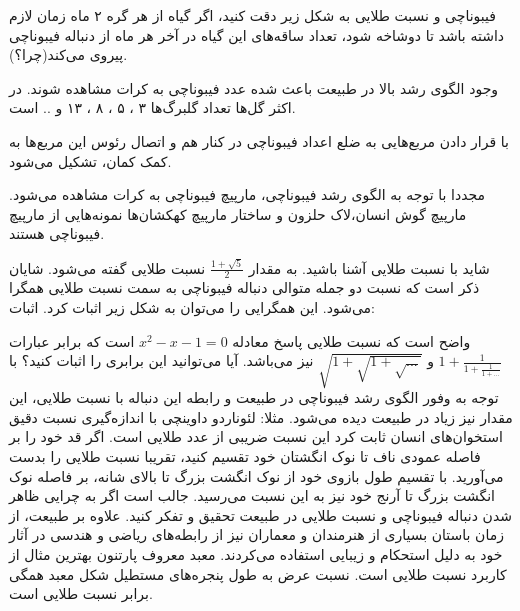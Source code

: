 \begin{EXTRA}{فیبوناچی و نسبت طلایی}
    \p
    به شکل زیر دقت کنید، اگر گیاه از هر گره ۲ ماه زمان لازم داشته باشد تا دوشاخه شود، تعداد ساقه‌های این گیاه در آخر هر ماه از دنباله فیبوناچی پیروی می‌کند(چرا؟).
    

    \p
    وجود الگوی رشد بالا در طبیعت باعث شده عدد فیبوناچی به کرات مشاهده شوند.
    در اکثر گل‌ها تعداد گلبرگ‌ها ۳ ، ۵ ، ۸ ، ۱۳ و .. است.


    \p
    با قرار دادن مربع‌هایی به ضلع اعداد فیبوناچی در کنار هم و اتصال رئوس این مربع‌ها به کمک کمان، تشکیل می‌شود.
    
    
    \p
    مجددا با توجه به الگوی رشد فیبوناچی، مارپیچ فیبوناچی به کرات مشاهده می‌شود.
    مارپیچ گوش انسان،لاک حلزون و ساختار مارپیچ کهکشان‌ها نمونه‌هایی از مارپیچ فیبوناچی هستند.
    
    
    \p
    شاید با نسبت طلایی آشنا باشید. به مقدار $\frac{1+\sqrt{5}}{2}$ نسبت طلایی گفته می‌شود.
    شایان ذکر است که نسبت دو جمله متوالی دنباله فیبوناچی به سمت نسبت طلایی همگرا می‌شود.
    این همگرایی را می‌توان به شکل زیر اثبات کرد.
    اثبات:

    \p
    واضح است که نسبت طلایی پاسخ معادله
    $x^2-x-1=0$
    است که برابر عبارات
    $1+\frac{1}{1+\frac{1}{1+...}}$
    و
    $\sqrt{1+\sqrt{1+\sqrt{...}}}$
    نیز می‌باشد.
    آیا می‌توانید این برابری را اثبات کنید؟
    \p
    با توجه به وفور الگوی رشد فیبوناچی در طبیعت و رابطه این دنباله با نسبت طلایی، این مقدار نیز زیاد در طبیعت دیده می‌شود.
    مثلا:
    لئوناردو داوینچی با اندازه‌گیری نسبت دقیق استخوان‌های انسان ثابت کرد این نسبت ضریبی از عدد طلایی است.
    اگر قد خود را بر فاصله عمودی ناف تا نوک انگشتان خود تقسیم کنید، تقریبا نسبت طلایی را بدست می‌آورید.
    با تقسیم طول بازوی خود از نوک انگشت بزرگ تا بالای شانه، بر فاصله نوک انگشت بزرگ تا آرنج خود نیز به این نسبت می‌رسید.
    جالب است اگر به چرایی ظاهر شدن دنباله فیبوناچی و نسبت طلایی در طبیعت تحقیق و تفکر کنید.
    \p
    علاوه بر طبیعت، از زمان باستان بسیاری از هنرمندان و معماران نیز از رابطه‌های ریاضی و هندسی در آثار خود به دلیل استحکام و زیبایی استفاده می‌کردند.
    معبد معروف پارتنون بهترین مثال از کاربرد نسبت طلایی است. نسبت عرض به طول پنجره‌های مستطیل شکل معبد همگی برابر نسبت طلایی است.

\end{EXTRA}